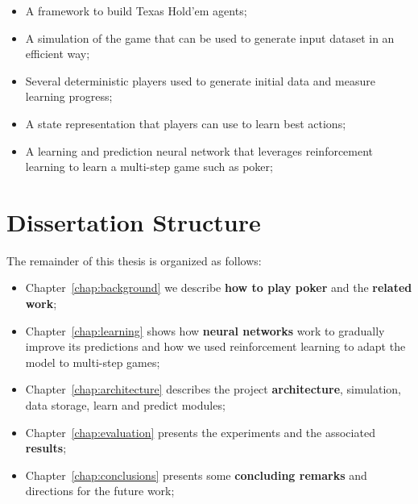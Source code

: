 \begin{itemize}
  \item A framework to build Texas Hold'em agents;
  \item A simulation of the game that can be used to generate input dataset in an efficient way;
  \item Several deterministic players used to generate initial data and measure learning progress;
  \item A state representation that players can use to learn best actions;
  \item A learning and prediction neural network that leverages reinforcement learning to learn a multi-step game such as poker;
\end{itemize}


\section{Dissertation Structure}
\label{sec:organization}

The remainder of this thesis is organized as follows:

\begin{itemize}
  \item Chapter~\ref{chap:background} we describe \textbf{how to play poker} and the \textbf{related work};
  \item Chapter~\ref{chap:learning} shows how \textbf{neural networks} work to gradually improve its predictions and how we used reinforcement learning to adapt the model to multi-step games;
  \item Chapter~\ref{chap:architecture} describes the project \textbf{architecture}, simulation, data storage, learn and predict modules;
  \item Chapter~\ref{chap:evaluation} presents the experiments and the associated \textbf{results};
  \item Chapter~\ref{chap:conclusions} presents some \textbf{concluding remarks} and directions for the future work;
\end{itemize}

